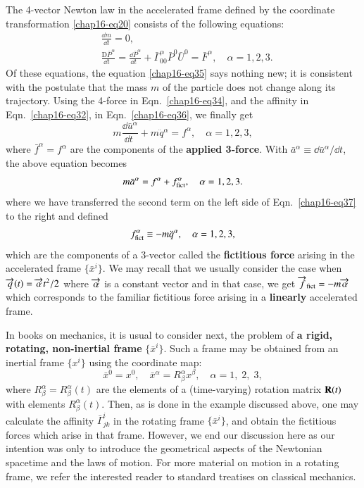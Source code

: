 The 4-vector Newton law in the accelerated frame  defined by the coordinate transformation \eqref{chap16-eq20} consists of the following equations: 
\begin{align}
&\frac{\dd m}{\dd t}=0,\label{chap16-eq35}\\
&\frac{\mathrm{D} {\bar{P}}^\alpha}{\dd t\;\:}= \frac{\dd \bar{P}^\alpha}{\dd t\;\:} + \bar{\Gamma}^\alpha_{00} \bar{P}^0 \bar{U}^0= {\bar{F}^\alpha},\quad \alpha=1,2,3. \label{chap16-eq36}
\end{align} 
Of these equations, the equation \eqref{chap16-eq35} says nothing new; it  is consistent with the postulate  that the mass $m$ of the  particle does not change along its trajectory. Using the 4-force in Eqn.~\eqref{chap16-eq34}, and the affinity in Eqn.~\eqref{chap16-eq32}, in Eqn.~\eqref{chap16-eq36}, we finally get
\begin{equation}
m\frac{\dd \bar{u}^\alpha}{\dd t\;}+m{\ddot{q}}{}^\alpha= f^\alpha, \quad \alpha=1,2,3,\label{chap16-eq37}
\end{equation}
where $\bar{f}^{\alpha}={f}^{\alpha}$ are the components of the \textbf{applied 3-force}. With $\bar{a}^\alpha\equiv{\dd \bar{u}^\alpha/\dd t}$, the above equation becomes
\begin{equation}
m\bar{a}^\alpha= f^\alpha+ f_{\rm{fict}}^\alpha,\quad \alpha=1,2,3.\label{chap16-eq38}
\end{equation}
where we have transferred the second term on the left side of Eqn.~\eqref{chap16-eq37} to the right and defined
\begin{equation}
f_{\rm{fict}}^\alpha \equiv -m\ddot{q}^\alpha,\quad \alpha=1,2,3,\label{chap16-eq39}
\end{equation}
which are the components of a 3-vector called the \textbf{fictitious force} arising in the  accelerated frame $\{\bar{x}^i \}$. We may recall that we usually consider the case  when $\overrightarrow{q}(t)=\overrightarrow{\alpha} t^2/2$ where $\overrightarrow{\alpha}$ is a constant vector and in that  case, we get $\overrightarrow{f}_{\rm{fict}}=-m\overrightarrow{\alpha}$ which corresponds to  the familiar fictitious force arising in a \textbf{linearly} accelerated frame.

In books on mechanics, it is usual to consider next, the problem of \textbf{a rigid, rotating, non-inertial frame} $\{\bar{x}^i\}$. Such a frame may be obtained from an inertial frame  $\{ x^i\}$ using the coordinate map:
\begin{equation}
\bar{x}^0=x^0, \quad \bar{x}^\alpha={R}^{\alpha}_{\beta} {x}^{\beta}, \quad \alpha=1,\;2,\;3,\label{chap16-eq40}
\end{equation}
where  ${R}^{\alpha}_{\beta}={R}^{\alpha}_{\beta}(t)$ are the elements of a (time-varying) rotation matrix ${\mathbf{R}} (t)$ with elements ${R}^{\alpha}_{\beta}(t)$. Then, as is done in the example discussed above, one may calculate the affinity $\bar{\Gamma}^i_{jk}$ in the rotating frame $\{\bar{x}^i\}$, and obtain the fictitious forces which arise in that frame. However, we end our discussion here as our intention was only to introduce the geometrical aspects of the Newtonian spacetime and the  laws of motion. For more material on motion in a rotating frame, we refer the interested reader to standard treatises on classical mechanics.


